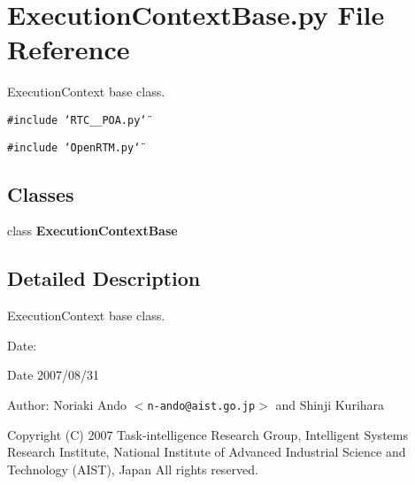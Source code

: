 \section{Execution\-Context\-Base.py File Reference}
\label{ExecutionContextBase_8py}
Execution\-Context base class. 

{\tt \#include \char`\"{}RTC\_\-\_\-POA.py\char`\"{}}\par
{\tt \#include \char`\"{}Open\-RTM.py\char`\"{}}\par
\subsection*{Classes}
\begin{CompactItemize}
\item 
class {\bf Execution\-Context\-Base}
\end{CompactItemize}


\subsection{Detailed Description}
Execution\-Context base class. 

\begin{Desc}
\item[Date:]\begin{Desc}
\item[Date]2007/08/31\end{Desc}
\end{Desc}
\begin{Desc}
\item[Author:]Noriaki Ando $<${\tt n-ando@aist.go.jp}$>$ and Shinji Kurihara\end{Desc}
Copyright (C) 2007 Task-intelligence Research Group, Intelligent Systems Research Institute, National Institute of Advanced Industrial Science and Technology (AIST), Japan All rights reserved.